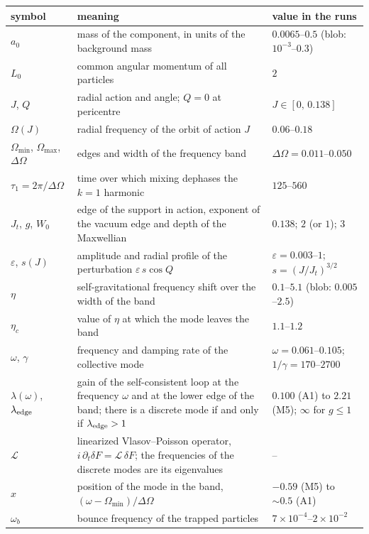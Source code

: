 \documentclass[11pt,a4paper]{article}
\begin{document}
\begin{center}
\small
\setlength{\tabcolsep}{4pt}
\begin{tabular}{L{2.4cm}L{7.0cm}L{4.3cm}}
\toprule
symbol & meaning & value in the runs\\
\midrule
$a_0$ & mass of the component, in units of the background mass & $0.0065$--$0.5$ (blob: $10^{-3}$--$0.3$)\\
$L_0$ & common angular momentum of all particles & $2$\\
$J$, $Q$ & radial action and angle; $Q=0$ at pericentre & $J\in[0,\,0.138]$\\
$\Omega(J)$ & radial frequency of the orbit of action $J$ & $0.06$--$0.18$\\
$\Omega_{\min}$, $\Omega_{\max}$, $\Delta\Omega$ & edges and width of the frequency band & $\Delta\Omega=0.011$--$0.050$\\
$\tau_1=2\pi/\Delta\Omega$ & time over which mixing dephases the $k=1$ harmonic & $125$--$560$\\
$J_t$, $g$, $W_0$ & edge of the support in action, exponent of the vacuum edge and depth of the Maxwellian & $0.138$; $2$ (or $1$); $3$\\
$\varepsilon$, $s(J)$ & amplitude and radial profile of the perturbation $\varepsilon\,s\cos Q$ & $\varepsilon=0.003$--$1$; $s=(J/J_t)^{3/2}$\\
$\eta$ & self-gravitational frequency shift over the width of the band & $0.1$--$5.1$ (blob: $0.005$--$2.5$)\\
$\eta_c$ & value of $\eta$ at which the mode leaves the band & $1.1$--$1.2$\\
$\omega$, $\gamma$ & frequency and damping rate of the collective mode & $\omega=0.061$--$0.105$; $1/\gamma=170$--$2700$\\
$\lambda(\omega)$, $\lambda_{\rm edge}$ & gain of the self-consistent loop at the frequency $\omega$ and at the lower edge of the band; there is a discrete mode if and only if $\lambda_{\rm edge}>1$ & $0.100$ (A1) to $2.21$ (M5); $\infty$ for $g\le1$\\
$\mathcal L$ & linearized Vlasov--Poisson operator, $i\,\partial_t\delta F=\mathcal L\,\delta F$; the frequencies of the discrete modes are its eigenvalues & --\\
$x$ & position of the mode in the band, $(\omega-\Omega_{\min})/\Delta\Omega$ & $-0.59$ (M5) to $\sim0.5$ (A1)\\
$\omega_b$ & bounce frequency of the trapped particles & $7\times10^{-4}$--$2\times10^{-2}$\\

\end{tabular}
\end{center}
\end{document}
